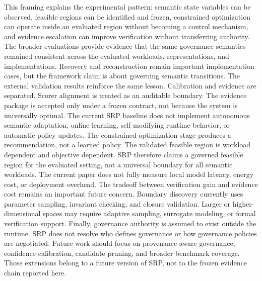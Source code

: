 {}This framing explains the experimental pattern: semantic state variables can be observed, feasible regions can be identified and frozen, constrained optimization can operate inside an evaluated region without becoming a control mechanism, and evidence escalation can improve verification without transferring authority. The broader evaluations provide evidence that the same governance semantics remained consistent across the evaluated workloads, representations, and implementations. Recovery and reconstruction remain important implementation cases, but the framework claim is about governing semantic transitions.\markdownRendererParagraphSeparator
{}The external validation results reinforce the same lesson. Calibration and evidence are separated. Scorer alignment is treated as an auditable boundary. The evidence package is accepted only under a frozen contract, not because the system is universally optimal.\markdownRendererInterblockSeparator
{}
\markdownRendererSectionEnd 
\markdownRendererSectionEnd \markdownRendererSectionBegin
{}\markdownRendererInterblockSeparator
{}The current SRP baseline does not implement autonomous semantic adaptation, online learning, self-modifying runtime behavior, or automatic policy updates. The constrained optimization stage produces a recommendation, not a learned policy.\markdownRendererParagraphSeparator
{}The validated feasible region is workload dependent and objective dependent. SRP therefore claims a governed feasible region for the evaluated setting, not a universal boundary for all semantic workloads.\markdownRendererParagraphSeparator
{}The current paper does not fully measure local model latency, energy cost, or deployment overhead. The tradeoff between verification gain and evidence cost remains an important future concern.\markdownRendererParagraphSeparator
{}Boundary discovery currently uses parameter sampling, invariant checking, and closure validation. Larger or higher-dimensional spaces may require adaptive sampling, surrogate modeling, or formal verification support.\markdownRendererParagraphSeparator
{}Finally, governance authority is assumed to exist outside the runtime. SRP does not resolve who defines governance or how governance policies are negotiated.\markdownRendererParagraphSeparator
{}Future work should focus on provenance-aware governance, confidence calibration, candidate pruning, and broader benchmark coverage. Those extensions belong to a future version of SRP, not to the frozen evidence chain reported here.\markdownRendererInterblockSeparator
